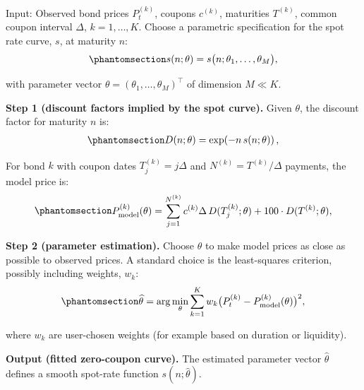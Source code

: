 \documentclass[
  letterpaper,
  DIV=11,
  numbers=noendperiod]{scrreprt}
\begin{document}
\begin{tcolorbox}[enhanced jigsaw, arc=.35mm, bottomrule=.15mm, bottomtitle=1mm, breakable, colback=white, colbacktitle=quarto-callout-note-color!10!white, colframe=quarto-callout-note-color-frame, coltitle=black, left=2mm, leftrule=.75mm, opacityback=0, opacitybacktitle=0.6, rightrule=.15mm, title=\textcolor{quarto-callout-note-color}{\faInfo}\hspace{0.5em}{Note}, titlerule=0mm, toprule=.15mm, toptitle=1mm]

Input: Observed bond prices \(P_t^{(k)}\), coupons \(c^{(k)}\),
maturities \(T^{(k)}\), common coupon interval \(\Delta\),
\(k=1,\dots,K\). Choose a parametric specification for the spot rate
curve, \(s\), at maturity \(n\):
\begin{equation}\protect\phantomsection\label{eq-gen-0040}{  
\begin{align}
      s(n;\theta) = s\big(n;\theta_1,\dots,\theta_M\big),
\end{align}
}\end{equation}

with parameter vector \(\theta = (\theta_1,\dots,\theta_M)^{\top}\) of
dimension \(M \ll K\).

\textbf{Step 1 (discount factors implied by the spot curve).} Given
\(\theta\), the discount factor for maturity \(n\) is:
\begin{equation}\protect\phantomsection\label{eq-gen-0041}{  
\begin{align}
      D(n;\theta) = \exp\!\left(-n\,s(n;\theta)\right),
\end{align}
}\end{equation}

For bond \(k\) with coupon dates \(T^{(k)}_j = j\Delta\) and
\(N^{(k)} = T^{(k)}/\Delta\) payments, the model price is:
\begin{equation}\protect\phantomsection\label{eq-gen-0042}{  
\begin{align}
      P^{(k)}_{\text{model}}(\theta)
      = \sum_{j=1}^{N^{(k)}} c^{(k)}\Delta\,D(T^{(k)}_j;\theta)
      + 100 \cdot D(T^{(k)};\theta),
\end{align}
}\end{equation}

\textbf{Step 2 (parameter estimation).} Choose \(\theta\) to make model
prices as close as possible to observed prices. A standard choice is the
least-squares criterion, possibly including weights, \(w_k\):
\begin{equation}\protect\phantomsection\label{eq-gen-0043}{  
\begin{align}
      \widehat{\theta}
      = \arg\min_{\theta} \sum_{k=1}^{K} w_k  \big(P_t^{(k)} - P^{(k)}_{\text{model}}(\theta)\big)^2,
\end{align}
}\end{equation}

where \(w_k\) are user-chosen weights (for example based on duration or
liquidity).

\textbf{Output (fitted zero-coupon curve).} The estimated parameter
vector \(\widehat{\theta}\) defines a smooth spot-rate function
\(s(n;\widehat{\theta})\).

\end{tcolorbox}
\end{document}
